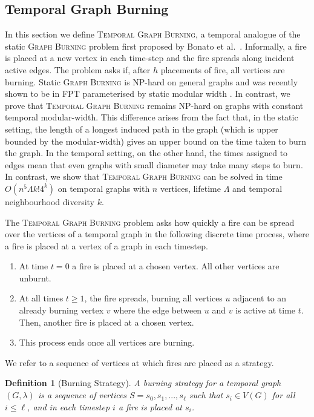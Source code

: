 \documentclass[preprint,12pt]{elsarticle}
\newtheorem{definition}{Definition}
\begin{document}
\subsection{Temporal Graph Burning}\label{sec:graph-burning}

In this section we define \textsc{Temporal Graph Burning}, a temporal analogue of the static \textsc{Graph Burning} problem first proposed by Bonato et al.~\cite{DBLP:conf/waw/BonatoJR14}. Informally, a fire is placed at a new vertex in each time-step and the fire spreads along incident active edges. The problem asks if, after $h$ placements of fire, all vertices are burning. Static \textsc{Graph Burning} is NP-hard on general graphs \cite{DBLP:journals/dam/BessyBJRR17} and was recently shown to be in FPT parameterised by static modular width \cite{DBLP:journals/algorithmica/KobayashiO22}. In contrast, we prove that \textsc{Temporal Graph Burning} remains NP-hard on graphs with constant temporal modular-width.  This difference arises from the fact that, in the static setting, the length of a longest induced path in the graph (which is upper bounded by the modular-width) gives an upper bound on the time taken to burn the graph.  In the temporal setting, on the other hand, the times assigned to edges mean that even graphs with small diameter may take many steps to burn. In contrast, we show that \textsc{Temporal Graph Burning} can be solved in time $O(n^5\Lambda k!4^k)$ on temporal graphs with $n$ vertices, lifetime $\Lambda$ and temporal neighbourhood diversity $k$.

The \textsc{Temporal Graph Burning} problem asks how quickly a fire can be spread over the vertices of a temporal graph in the following discrete time process, where a fire is placed at a vertex of a graph in each timestep.
\begin{enumerate}
    \item At time $t = 0$ a fire is placed at a chosen vertex. All other vertices are unburnt.
    \item At all times $t \geq 1$, the fire spreads, burning all vertices $u$ adjacent to an already burning vertex $v$ where the edge between $u$ and $v$ is active at time $t$. Then, another fire is placed at a chosen vertex.
    \item This process ends once all vertices are burning.
\end{enumerate}

We refer to a sequence of vertices at which fires are placed as a strategy. 

\begin{definition}[Burning Strategy]
    A \emph{burning strategy} for a temporal graph $(G, \lambda)$ is a sequence of vertices $S = s_0, s_1, ..., s_\ell$ such that $s_i \in V(G)$ for all $i \leq \ell$, and in each timestep $i$ a fire is placed at $s_i$.
\end{definition}
\end{document}
